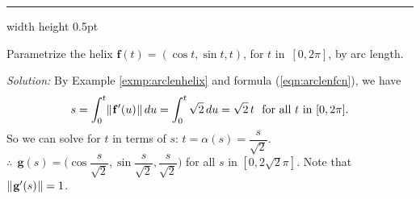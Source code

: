 \smallskip
\hrule width \textwidth height 0.5pt
\begin{exmp}\label{exmp:arcparamhelix}
 Parametrize the helix $\mathbf{f}(t) = (\cos t , \sin t , t)$, for $t$ in~$[0,2\pi]$, by arc length.
 \smallskip
 \par\noindent \emph{Solution:} By Example \ref{exmp:arclenhelix} and formula (\ref{eqn:arclenfcn}), we have
 \begin{displaymath}
  s = \int_{0}^{t} \lVert\mspace{1mu}\mathbf{f}'(u)\mspace{1mu}\rVert\,du = \int_{0}^{t} \sqrt{2} \,du = \sqrt{2}\,t
  \text{~~for all $t$ in $[0,2\pi]$.}
 \end{displaymath}
 So we can solve for $t$ in terms of $s$: $t = \alpha(s) = \dfrac{s}{\sqrt{2}}$.\\$\therefore ~~ \mathbf{g}(s) =
 \biggl( \cos \dfrac{s}{\sqrt{2}} , \sin \dfrac{s}{\sqrt{2}} , \dfrac{s}{\sqrt{2}} \biggr)$ for all $s$
 in $[0,2\sqrt{2} \pi]$. 
 Note that $\lVert\mspace{1mu}\mathbf{g}'(s)\mspace{1mu}\rVert = 1$.
\end{exmp}


